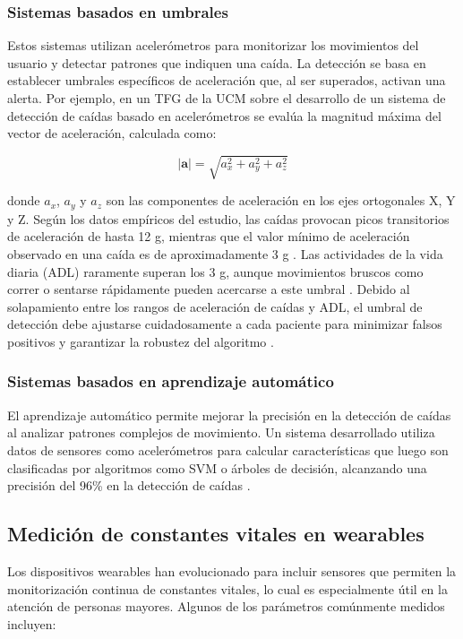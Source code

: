 \documentclass[12pt, a4paper]{article}
\begin{document}
	\subsubsection{Sistemas basados en umbrales}

	
	Estos sistemas utilizan acelerómetros para monitorizar los movimientos del usuario y detectar patrones que indiquen una caída. La detección se basa en establecer umbrales específicos de aceleración que, al ser superados, activan una alerta. Por ejemplo, en un TFG de la UCM sobre el desarrollo de un sistema de detección de caídas basado en acelerómetros se evalúa la magnitud máxima del vector de aceleración, calculada como:
	
	\[
	|\mathbf{a}| = \sqrt{a_x^2 + a_y^2 + a_z^2}
	\]
	
	donde \(a_x\), \(a_y\) y \(a_z\) son las componentes de aceleración en los ejes ortogonales X, Y y Z. Según los datos empíricos del estudio, las caídas provocan picos transitorios de aceleración de hasta 12 g, mientras que el valor mínimo de aceleración observado en una caída es de aproximadamente 3 g \cite{bourke2007}. Las actividades de la vida diaria (ADL) raramente superan los 3 g, aunque movimientos bruscos como correr o sentarse rápidamente pueden acercarse a este umbral \cite{kangas2012}. Debido al solapamiento entre los rangos de aceleración de caídas y ADL, el umbral de detección debe ajustarse cuidadosamente a cada paciente para minimizar falsos positivos y garantizar la robustez del algoritmo \cite{ucm2015}.
	
	\subsubsection{Sistemas basados en aprendizaje automático}
	
	El aprendizaje automático permite mejorar la precisión en la detección de caídas al analizar patrones complejos de movimiento. Un sistema desarrollado utiliza datos de sensores como acelerómetros para calcular características que luego son clasificadas por algoritmos como SVM o árboles de decisión, alcanzando una precisión del 96\% en la detección de caídas \cite{lauro2021}.
	
	
	\subsection{Medición de constantes vitales en wearables}
	
	Los dispositivos wearables han evolucionado para incluir sensores que permiten la monitorización continua de constantes vitales, lo cual es especialmente útil en la atención de personas mayores. Algunos de los parámetros comúnmente medidos incluyen:
	
\end{document}
